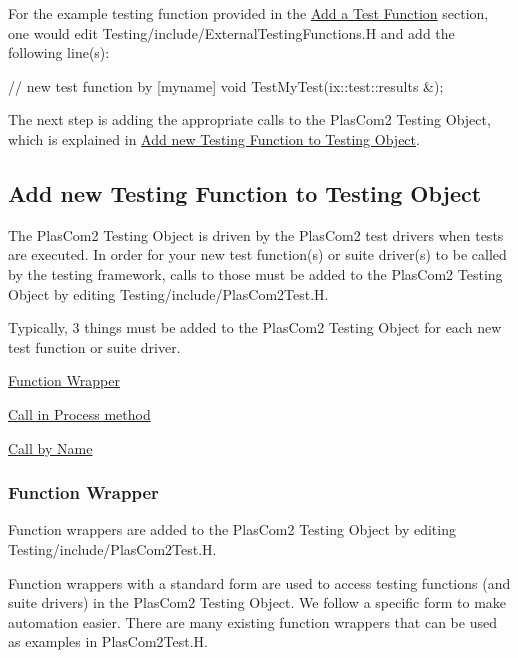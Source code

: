 For the example testing function provided in the \hyperlink{testing_reference_addfunc}{Add a Test Function} section, one would edit Testing/include/\+External\+Testing\+Functions.\+H and add the following line(s)\+:


\begin{DoxyCode}
\textcolor{comment}{// new test function by [myname]}
\textcolor{keywordtype}{void} TestMyTest(ix::test::results &);
\end{DoxyCode}


The next step is adding the appropriate calls to the Plas\+Com2 Testing Object, which is explained in \hyperlink{testing_reference_addcall}{Add new Testing Function to Testing Object}.\hypertarget{testing_reference_addcall}{}\subsection{Add new Testing Function to Testing Object}\label{testing_reference_addcall}
The Plas\+Com2 Testing Object is driven by the Plas\+Com2 test drivers when tests are executed. In order for your new test function(s) or suite driver(s) to be called by the testing framework, calls to those must be added to the Plas\+Com2 Testing Object by editing Testing/include/\+Plas\+Com2\+Test.\+H.

Typically, 3 things must be added to the Plas\+Com2 Testing Object for each new test function or suite driver.


\begin{DoxyItemize}
\item \hyperlink{testing_reference_wrapper}{Function Wrapper}
\item \hyperlink{testing_reference_processcall}{Call in Process method}
\item \hyperlink{testing_reference_callbyname}{Call by Name}
\end{DoxyItemize}\hypertarget{testing_reference_wrapper}{}\subsubsection{Function Wrapper}\label{testing_reference_wrapper}
Function wrappers are added to the Plas\+Com2 Testing Object by editing Testing/include/\+Plas\+Com2\+Test.\+H.

Function wrappers with a standard form are used to access testing functions (and suite drivers) in the Plas\+Com2 Testing Object. We follow a specific form to make automation easier. There are many existing function wrappers that can be used as examples in Plas\+Com2\+Test.\+H.

